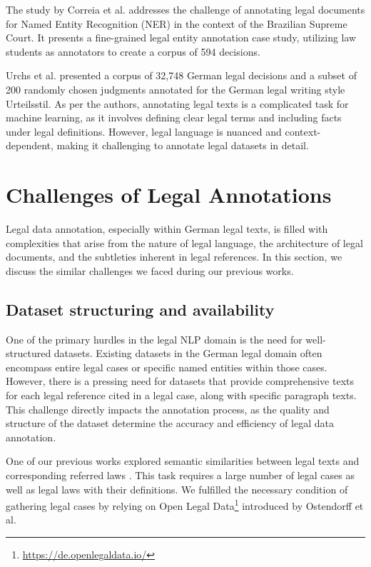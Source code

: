 \documentclass{IOS-Book-Article}
\begin{document}
The study by Correia et al. \cite{r7} addresses the challenge of annotating legal documents for Named Entity Recognition (NER) in the context of the Brazilian Supreme Court. It presents a fine-grained legal entity annotation case study, utilizing law students as annotators to create a corpus of 594 decisions.

Urchs et al. \cite{r8} presented a corpus of 32,748 German legal decisions and a subset of 200 randomly chosen judgments annotated for the German legal writing style Urteilsstil. As per the authors, annotating legal texts is a complicated task for machine learning, as it involves defining clear legal terms and including facts under legal definitions. However, legal language is nuanced and context-dependent, making it challenging to annotate legal datasets in detail.

\section{Challenges of Legal Annotations}

Legal data annotation, especially within German legal texts, is filled with complexities that arise from the nature of legal language, the architecture of legal documents, and the subtleties inherent in legal references. In this section, we discuss the similar challenges we faced during our previous works.

\subsection{Dataset structuring and availability}
One of the primary hurdles in the legal NLP domain is the need for well-structured datasets. Existing datasets in the German legal domain often encompass entire legal cases or specific named entities within those cases. However, there is a pressing need for datasets that provide comprehensive texts for each legal reference cited in a legal case, along with specific paragraph texts. This challenge directly impacts the annotation process, as the quality and structure of the dataset determine the accuracy and efficiency of legal data annotation.

One of our previous works explored semantic similarities between legal texts and corresponding referred laws \cite{r9}. This task requires a large number of legal cases as well as legal laws with their definitions. We fulfilled the necessary condition of gathering legal cases by relying on Open Legal Data\footnote{\url{https://de.openlegaldata.io/}} introduced by Ostendorff et al. \cite{r10}
\end{document}
